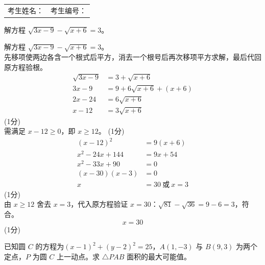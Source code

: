\documentclass[12pt,a4paper]{exam-zh}
\newcommand{\qscoreoffset}{4em}
\newcommand{\qscore}[1]{%
    \leavevmode\unskip\nobreak\hfill
    \makebox[0pt][l]{\makebox[\qscoreoffset][r]{(#1\%)}}%
}
\begin{document}
    \vfill

    \begin{tabular*}{\linewidth}{@{\extracolsep{\fill}}ll}
    考生姓名：\underline{\hspace{4.2cm}} & 考生编号：\underline{\hspace{4.0cm}}
    \end{tabular*}


\newpage


%
\iffalse
\begin{question}[points = 4]
    解方程 $\sqrt{3x-9}-\sqrt{x+6}=3$。
    \qscore{4}
\end{question}

\begin{solution}
    解方程 $\sqrt{3x-9}-\sqrt{x+6}=3$。\\
    先移项使两边各含一个根式后平方，消去一个根号后再次移项平方求解，最后代回原方程验根。
    \begin{align*}
        \sqrt{3x-9} &= 3+\sqrt{x+6} \\
        3x-9 &= 9+6\sqrt{x+6}+(x+6) \\
        2x-24 &= 6\sqrt{x+6} \\
        x-12 &= 3\sqrt{x+6}
    \end{align*}
    \hfill (1分) \\
    需满足 $x-12\geq0$，即 $x\geq12$。
    \hfill (1分) \\
    \begin{align*}
        (x-12)^2 &= 9(x+6) \\
        x^2-24x+144 &= 9x+54 \\
        x^2-33x+90 &= 0 \\
        (x-30)(x-3) &= 0 \\
        x &= 30 \ \text{或} \ x=3
    \end{align*}
    \hfill (1分) \\
    由 $x\geq12$ 舍去 $x=3$，代入原方程验证 $x=30$：$\sqrt{81}-\sqrt{36}=9-6=3$，符合。
    \[
        x=30
    \]
    \hfill (1分)
\end{solution}

\begin{question}[points = 4]
    已知圆 $C$ 的方程为$(x-1)^2 + (y-2)^2 = 25$，$A(1,-3)$ 与 $B(9,3)$ 为两个定点，$P$ 为圆 $C$ 上一动点。求 $\triangle PAB$ 面积的最大可能值。
    \qscore{4}
\end{question}
\end{document}
